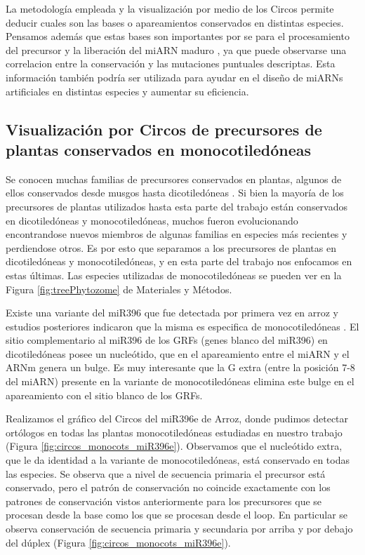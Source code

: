 La metodología empleada y la visualización por medio de los Circos permite deducir cuales son las bases o apareamientos conservados en distintas especies.
Pensamos además que estas bases son importantes por se para el procesamiento del precursor y la liberación del miARN maduro , ya que puede observarse una correlacion entre la conservación y las mutaciones puntuales descriptas.
Esta información también podría ser utilizada para ayudar en el diseño de miARNs artificiales en distintas especies y aumentar su eficiencia.

\subsection{Visualización por Circos de precursores de plantas conservados en monocotiledóneas}

Se conocen muchas familias de precursores conservados en plantas, algunos de ellos conservados desde musgos hasta dicotiledóneas \citep{pmid15849273,Axtell2008343,citeulike:8816489}.
Si bien la mayoría de los precursores de plantas utilizados hasta esta parte del trabajo están conservados en dicotiledóneas y monocotiledóneas, muchos fueron evolucionando encontrandose nuevos miembros de algunas familias en especies más recientes y perdiendose otros.    
Es por esto que separamos a los precursores de plantas en dicotiledóneas y monocotiledóneas, y en esta parte del trabajo nos enfocamos en estas últimas.
Las especies utilizadas de monocotiledóneas se pueden ver en la Figura \ref{fig:treePhytozome} de Materiales y Métodos.

Existe una variante del miR396 que fue detectada por primera vez en arroz \citep{pmid15805478} y estudios posteriores indicaron que la misma es especifica de monocotiledóneas \citep{pmid18416839, pmid19936050}.
El sitio complementario al miR396 de los GRFs (genes blanco del miR396) en dicotiledóneas posee un nucleótido, que en el apareamiento entre el miARN y el ARNm genera un bulge.
Es muy interesante que la G extra (entre la posición 7-8 del miARN) presente en la variante de monocotiledóneas elimina este bulge en el apareamiento con el sitio blanco de los GRFs.

Realizamos el gráfico del Circos del miR396e de Arroz, donde pudimos detectar ortólogos en todas las plantas monocotiledóneas estudiadas en nuestro trabajo (Figura \ref{fig:circos_monocots_miR396e}).
Observamos que el nucleótido extra, que le da identidad a la variante de monocotiledóneas, está conservado en todas las especies.
Se observa que a nivel de secuencia primaria el precursor está conservado, pero el patrón de conservación no coincide exactamente con los patrones de conservación vistos anteriormente para los precursores que se procesan desde la base como los que se procesan desde el loop.
En particular se observa conservación de secuencia primaria y secundaria por arriba y por debajo del dúplex (Figura \ref{fig:circos_monocots_miR396e}).

